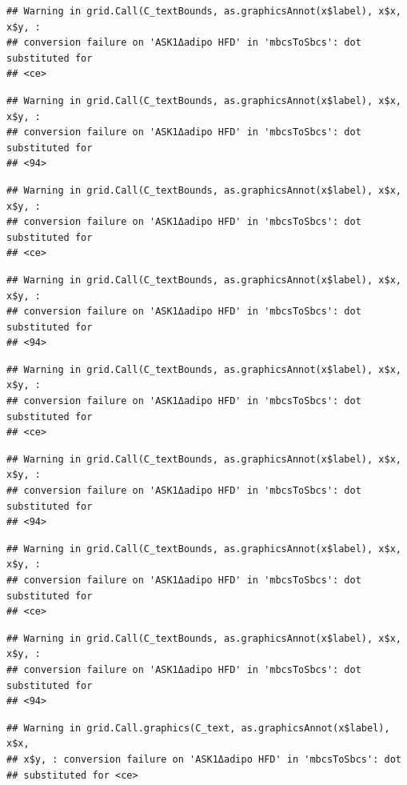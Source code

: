 \documentclass[]{book}
\begin{document}
\begin{verbatim}
## Warning in grid.Call(C_textBounds, as.graphicsAnnot(x$label), x$x, x$y, :
## conversion failure on 'ASK1Δadipo HFD' in 'mbcsToSbcs': dot substituted for
## <ce>
\end{verbatim}

\begin{verbatim}
## Warning in grid.Call(C_textBounds, as.graphicsAnnot(x$label), x$x, x$y, :
## conversion failure on 'ASK1Δadipo HFD' in 'mbcsToSbcs': dot substituted for
## <94>
\end{verbatim}

\begin{verbatim}
## Warning in grid.Call(C_textBounds, as.graphicsAnnot(x$label), x$x, x$y, :
## conversion failure on 'ASK1Δadipo HFD' in 'mbcsToSbcs': dot substituted for
## <ce>
\end{verbatim}

\begin{verbatim}
## Warning in grid.Call(C_textBounds, as.graphicsAnnot(x$label), x$x, x$y, :
## conversion failure on 'ASK1Δadipo HFD' in 'mbcsToSbcs': dot substituted for
## <94>
\end{verbatim}

\begin{verbatim}
## Warning in grid.Call(C_textBounds, as.graphicsAnnot(x$label), x$x, x$y, :
## conversion failure on 'ASK1Δadipo HFD' in 'mbcsToSbcs': dot substituted for
## <ce>
\end{verbatim}

\begin{verbatim}
## Warning in grid.Call(C_textBounds, as.graphicsAnnot(x$label), x$x, x$y, :
## conversion failure on 'ASK1Δadipo HFD' in 'mbcsToSbcs': dot substituted for
## <94>
\end{verbatim}

\begin{verbatim}
## Warning in grid.Call(C_textBounds, as.graphicsAnnot(x$label), x$x, x$y, :
## conversion failure on 'ASK1Δadipo HFD' in 'mbcsToSbcs': dot substituted for
## <ce>
\end{verbatim}

\begin{verbatim}
## Warning in grid.Call(C_textBounds, as.graphicsAnnot(x$label), x$x, x$y, :
## conversion failure on 'ASK1Δadipo HFD' in 'mbcsToSbcs': dot substituted for
## <94>
\end{verbatim}

\begin{verbatim}
## Warning in grid.Call.graphics(C_text, as.graphicsAnnot(x$label), x$x,
## x$y, : conversion failure on 'ASK1Δadipo HFD' in 'mbcsToSbcs': dot
## substituted for <ce>
\end{verbatim}
\end{document}

